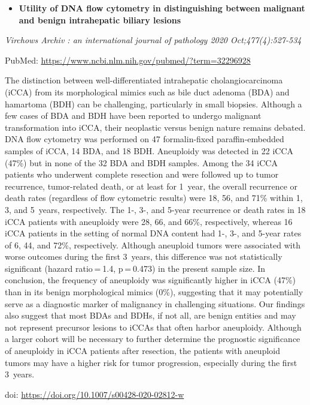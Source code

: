 \documentclass[
]{article}
\providecommand{\tightlist}{%
  \setlength{\itemsep}{0pt}\setlength{\parskip}{0pt}}
\begin{document}
\begin{itemize}
\tightlist
\item
  \textbf{Utility of DNA flow cytometry in distinguishing between
  malignant and benign intrahepatic biliary lesions}
\end{itemize}

\emph{Virchows Archiv : an international journal of pathology 2020
Oct;477(4):527-534}

PubMed: \url{https://www.ncbi.nlm.nih.gov/pubmed/?term=32296928}

The distinction between well-differentiated intrahepatic
cholangiocarcinoma (iCCA) from its morphological mimics such as bile
duct adenoma (BDA) and hamartoma (BDH) can be challenging, particularly
in small biopsies. Although a few cases of BDA and BDH have been
reported to undergo malignant transformation into iCCA, their neoplastic
versus benign nature remains debated. DNA flow cytometry was performed
on 47 formalin-fixed paraffin-embedded samples of iCCA, 14 BDA, and 18
BDH. Aneuploidy was detected in 22 iCCA (47\%) but in none of the 32 BDA
and BDH samples. Among the 34 iCCA patients who underwent complete
resection and were followed up to tumor recurrence, tumor-related death,
or at least for 1~year, the overall recurrence or death rates
(regardless of flow cytometric results) were 18, 56, and 71\% within 1,
3, and 5~years, respectively. The 1-, 3-, and 5-year recurrence or death
rates in 18 iCCA patients with aneuploidy were 28, 66, and 66\%,
respectively, whereas 16 iCCA patients in the setting of normal DNA
content had 1-, 3-, and 5-year rates of 6, 44, and 72\%, respectively.
Although aneuploid tumors were associated with worse outcomes during the
first 3~years, this difference was not statistically significant (hazard
ratio = 1.4, p = 0.473) in the present sample size. In conclusion, the
frequency of aneuploidy was significantly higher in iCCA (47\%) than in
its benign morphological mimics (0\%), suggesting that it may
potentially serve as a diagnostic marker of malignancy in challenging
situations. Our findings also suggest that most BDAs and BDHs, if not
all, are benign entities and may not represent precursor lesions to
iCCAs that often harbor aneuploidy. Although a larger cohort will be
necessary to further determine the prognostic significance of aneuploidy
in iCCA patients after resection, the patients with aneuploid tumors may
have a higher risk for tumor progression, especially during the first
3~years.

doi: \url{https://doi.org/10.1007/s00428-020-02812-w}
\end{document}

